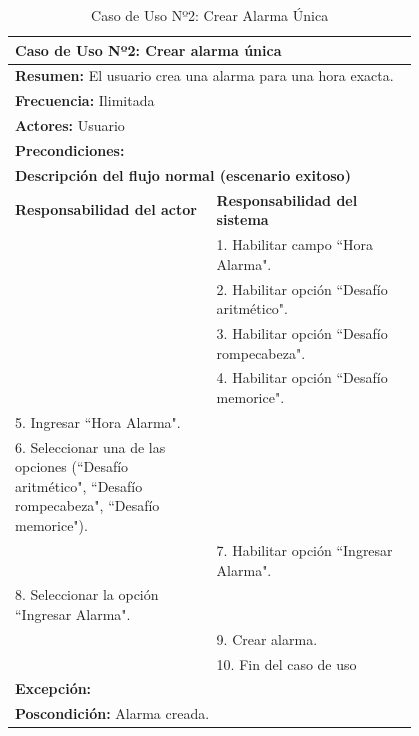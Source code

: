 \begin{table}[H]
    \centering
    \caption{Caso de Uso Nº2: Crear Alarma Única}
    \vspace{10pt}
    
    \begin{tabular}{| p{0.4\linewidth} | p{0.4\linewidth} |}
        \hline
        \multicolumn{2}{|l|}{\textbf{Caso de Uso Nº2:} Crear alarma única} \\
        \hline
        \multicolumn{2}{|l|}{\textbf{Resumen:} El usuario crea una alarma para una hora exacta.} \\
        \hline
        \multicolumn{2}{|l|}{\textbf{Frecuencia:} Ilimitada} \\
        \hline
        \multicolumn{2}{|l|}{\textbf{Actores:} Usuario} \\
        \hline
        \multicolumn{2}{|l|}{\textbf{Precondiciones:}} \\
        \hline
        \multicolumn{2}{|l|}{\textbf{Descripción del flujo normal (escenario exitoso)} } \\
        \hline
        \textbf{Responsabilidad del actor} & \textbf{Responsabilidad del sistema} \\
        & 1. Habilitar campo ``Hora Alarma". \\
        & 2. Habilitar opción ``Desafío aritmético". \\
        & 3. Habilitar opción ``Desafío rompecabeza". \\
        & 4. Habilitar opción ``Desafío memorice". \\
        5. Ingresar ``Hora Alarma". &\\
        6. Seleccionar una de las opciones (``Desafío aritmético", ``Desafío rompecabeza", ``Desafío memorice"). & \\
        & 7. Habilitar opción ``Ingresar Alarma". \\
        8. Seleccionar la opción ``Ingresar Alarma". &\\
        & 9. Crear alarma. \\
        & 10. Fin del caso de uso \\
        \hline
        \multicolumn{2}{|p{0.8\linewidth}|}{\textbf{Excepción:}}\\
        \hline
        \multicolumn{2}{|l|}{\textbf{Poscondición:} Alarma creada.} \\
        \hline
    \end{tabular}

    \label{table:2}
\end{table}

